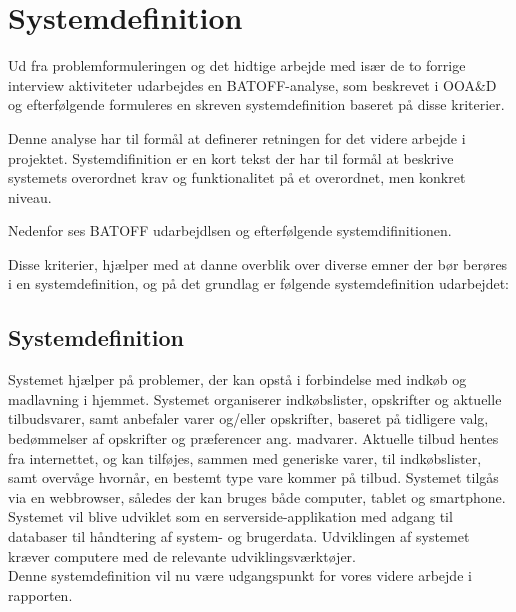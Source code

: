 \section{Systemdefinition}
Ud fra problemformuleringen og det hidtige arbejde med især de to forrige interview aktiviteter udarbejdes en BATOFF-analyse, som beskrevet i OOA\&D\citep{OOA&D2001} og efterfølgende formuleres en skreven systemdefinition baseret på disse kriterier.

Denne analyse har til formål at definerer retningen for det videre arbejde i projektet.
Systemdifinition er en kort tekst der har til formål at beskrive systemets overordnet krav og funktionalitet på et overordnet, men konkret niveau.

Nedenfor ses BATOFF udarbejdlsen og efterfølgende systemdifinitionen.



Disse kriterier, hjælper med at danne overblik over diverse emner der bør berøres i en systemdefinition, og på det grundlag er følgende systemdefinition udarbejdet:

\subsection{Systemdefinition}

Systemet hjælper på problemer, der kan opstå i forbindelse med indkøb og madlavning i hjemmet.
Systemet organiserer indkøbslister, opskrifter og aktuelle tilbudsvarer, samt anbefaler varer og/eller opskrifter, baseret på tidligere valg, bedømmelser af opskrifter og præferencer ang. madvarer.
Aktuelle tilbud hentes fra internettet, og kan tilføjes, sammen med generiske varer, til indkøbslister, samt overvåge hvornår, en bestemt type vare kommer på tilbud.
Systemet tilgås via en webbrowser, således der kan bruges både computer, tablet og smartphone.
Systemet vil blive udviklet som en serverside-applikation med adgang til databaser til håndtering af system- og brugerdata.
Udviklingen af systemet kræver computere med de relevante udviklingsværktøjer.\\

Denne systemdefinition vil nu være udgangspunkt for vores videre arbejde i rapporten.
